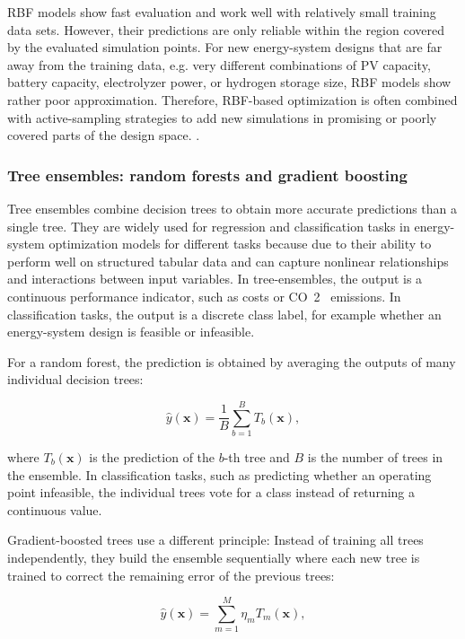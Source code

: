 RBF models show fast evaluation and work well with relatively small
training data sets. However, their predictions are only reliable within
the region covered by the evaluated simulation points. For new
energy-system designs that are far away from the training data, e.g.
very different combinations of PV capacity, battery capacity,
electrolyzer power, or hydrogen storage size, RBF models show rather
poor approximation. Therefore, RBF-based optimization is often combined
with active-sampling strategies to add new simulations in promising or
poorly covered parts of the design space.
\cite{Deng2020831,Tian2020,Han2018622,Pang2023}.

\subsubsection{Tree ensembles: random forests and gradient boosting}
\label{sec:tax:trees}

Tree ensembles combine decision trees to obtain more accurate
predictions than a single tree. They are widely used for regression and
classification tasks in energy-system optimization models for different
tasks because due to their ability to perform well on structured tabular
data and can capture nonlinear relationships and interactions between
input variables. In tree-ensembles, the output is a continuous
performance indicator, such as costs or CO~2~ emissions. In
classification tasks, the output is a discrete class label, for example
whether an energy-system design is feasible or infeasible.

For a random forest, the prediction is obtained by averaging the outputs
of many individual decision trees:

$$\begin{equation}
 \hat{y}(\mathbf{x}) = \frac{1}{B} \sum_{b=1}^{B} T_b(\mathbf{x}),
\end{equation}$$

where $T_b(\mathbf{x})$ is the prediction of the $b$-th tree and $B$ is
the number of trees in the ensemble. In classification tasks, such as
predicting whether an operating point infeasible, the individual trees
vote for a class instead of returning a continuous value.

Gradient-boosted trees use a different principle: Instead of training
all trees independently, they build the ensemble sequentially where each
new tree is trained to correct the remaining error of the previous
trees:

$$\begin{equation}
 \hat{y}(\mathbf{x}) = \sum_{m=1}^{M} \eta_m T_m(\mathbf{x}),
\end{equation}$$

